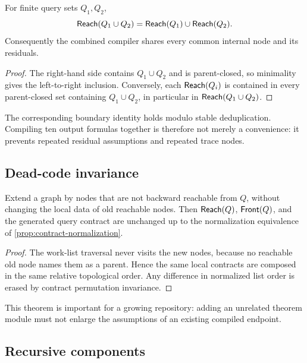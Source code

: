 \begin{proposition}
For finite query sets \(Q_1,Q_2\),
\[
 \mathsf{Reach}(Q_1\cup Q_2)=\mathsf{Reach}(Q_1)\cup\mathsf{Reach}(Q_2).
\]
Consequently the combined compiler shares every common internal node and its residuals.
\end{proposition}

\begin{proof}
The right-hand side contains \(Q_1\cup Q_2\) and is parent-closed, so minimality gives the left-to-right inclusion.  Conversely, each \(\mathsf{Reach}(Q_i)\) is contained in every parent-closed set containing \(Q_1\cup Q_2\), in particular in \(\mathsf{Reach}(Q_1\cup Q_2)\).
\end{proof}

The corresponding boundary identity holds modulo stable deduplication.  Compiling ten output formulas together is therefore not merely a convenience: it prevents repeated residual assumptions and repeated trace nodes.

\subsection{Dead-code invariance}

\begin{theorem}\label{thm:dead-code}
Extend a graph by nodes that are not backward reachable from \(Q\), without changing the local data of old reachable nodes.  Then \(\mathsf{Reach}(Q)\), \(\mathsf{Front}(Q)\), and the generated query contract are unchanged up to the normalization equivalence of \cref{prop:contract-normalization}.
\end{theorem}

\begin{proof}
The work-list traversal never visits the new nodes, because no reachable old node names them as a parent.  Hence the same local contracts are composed in the same relative topological order.  Any difference in normalized list order is erased by contract permutation invariance.
\end{proof}

This theorem is important for a growing repository: adding an unrelated theorem module must not enlarge the assumptions of an existing compiled endpoint.

\subsection{Recursive components}

